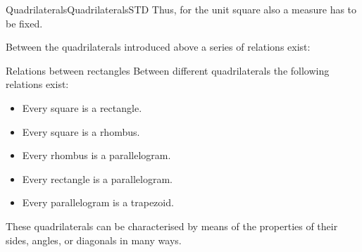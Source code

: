 \begin{MXContent}{Quadrilaterals}{Quadrilaterals}{STD}
Thus, for the unit square also a measure has to be fixed.

\begin{center}
\end{center}

Between the quadrilaterals introduced above a series of relations exist:

\begin{MXInfo}{Relations between rectangles}%
Between different quadrilaterals the following relations exist:
\begin{itemize}
\item Every square is a rectangle.
\item Every square is a rhombus.
\item Every rhombus is a parallelogram.
\item Every rectangle is a parallelogram.
\item Every parallelogram is a trapezoid.
\end{itemize}
\end{MXInfo}

These quadrilaterals can be characterised by means of the properties of 
their sides, angles, or diagonals in many ways.


\end{MXContent}
